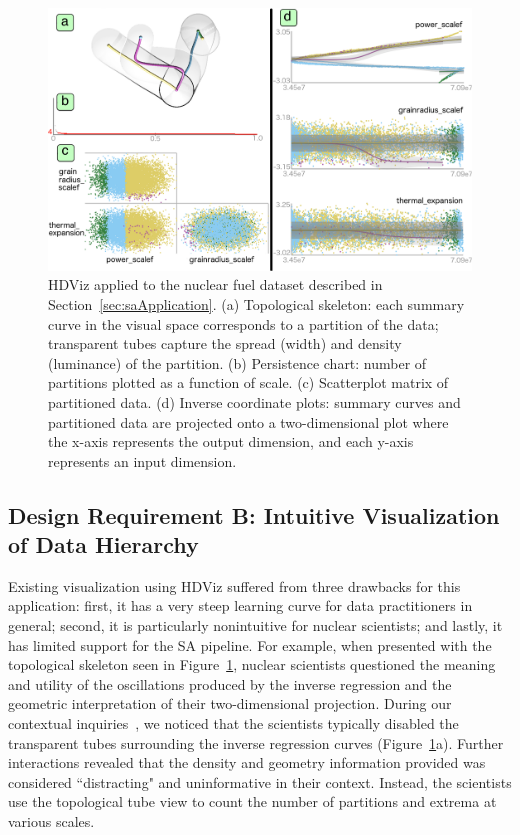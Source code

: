 \begin{figure}[htbp]
  \centering
  \includegraphics[width=1.0\linewidth]{figs/chap6/HDViz-original}
  \caption{HDViz applied to the nuclear fuel
  dataset described in Section~\ref{sec:saApplication}.
  (a) Topological skeleton: each summary curve in the visual space corresponds to a partition of the data; transparent tubes capture the spread (width) and density (luminance) of the partition.
  (b) Persistence chart: number of partitions plotted as a function of scale.
  (c) Scatterplot matrix of partitioned data.
  (d) Inverse coordinate plots: summary curves and partitioned data are projected onto a two-dimensional plot where the x-axis represents the output dimension, and each y-axis
  represents an input dimension. }
  \label{fig:hdviz}
\end{figure}

\subsection{Design Requirement B: Intuitive Visualization\\of Data Hierarchy}
Existing visualization using HDViz suffered from three drawbacks for this application: first, it has a very steep learning curve for data practitioners in general; second, it is particularly nonintuitive for nuclear scientists; and lastly, it has limited support for the SA pipeline.
%
For example, when presented with the topological skeleton seen in Figure~\ref{fig:hdviz}, nuclear scientists questioned the meaning and utility of the oscillations produced by the inverse regression and the geometric interpretation of their two-dimensional projection.
%
During our contextual inquiries~\cite{HoltzblattJones1993}, we noticed that the scientists typically disabled the transparent tubes surrounding the inverse regression curves (Figure~\ref{fig:hdviz}a).
%
Further interactions revealed that the density and geometry information provided was considered ``distracting" and uninformative in their context. Instead, the scientists use the topological tube view to count the number of partitions and extrema at various scales.


